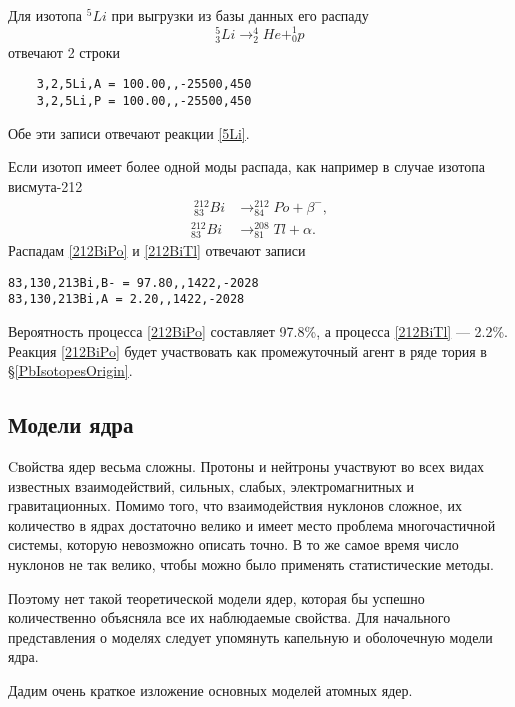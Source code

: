 \documentclass[a5paper,openany]{book}
\begin{document}
Для изотопа $^5Li$ при выгрузки из базы данных его распаду 
\begin{equation}\label{5Li}
_3^5Li \longrightarrow _2^4He + _0^1p
\end{equation}
отвечают 2 строки
\begin{verbatim}
	3,2,5Li,A = 100.00,,-25500,450
	3,2,5Li,P = 100.00,,-25500,450
\end{verbatim}		
Обе эти записи отвечают реакции \eqref{5Li}.

Если изотоп имеет более одной моды распада, как например в случае изотопа висмута-212
\begin{align}\
_{83}^{212}Bi & \longrightarrow _{84}^{212}Po + \beta^{-}, \label{212BiPo}\\
_{83}^{212}Bi & \longrightarrow _{81}^{208}Tl + \alpha. \label{212BiTl}
\end{align}
Распадам \eqref{212BiPo} и \eqref{212BiTl} отвечают записи  
\begin{verbatim}
83,130,213Bi,B- = 97.80,,1422,-2028
83,130,213Bi,A = 2.20,,1422,-2028
\end{verbatim}		
Вероятность процесса \eqref{212BiPo} составляет  97.8\%, а процесса \eqref{212BiTl} --- 2.2\%.
Реакция \eqref{212BiPo}  будет участвовать как промежуточный агент в ряде тория в \S\ref{PbIsotopesOrigin}. 
	
	\subsection{Модели ядра} \label{NucleiModels}
	
	Cвойства ядер весьма сложны. Протоны и нейтроны участвуют во всех видах известных взаимодействий, сильных, слабых, электромагнитных и гравитационных. Помимо того, что взаимодействия нуклонов сложное, их количество в ядрах достаточно велико и имеет место проблема многочастичной системы, которую невозможно описать точно. В то же самое время число нуклонов не так велико, чтобы можно было применять статистические методы.  
	
	Поэтому нет такой теоретической модели ядер, которая бы успешно количественно объясняла все их наблюдаемые свойства.
	Для начального представления о моделях следует упомянуть капельную и оболочечную модели ядра.
	
	Дадим очень краткое изложение основных  моделей атомных ядер. 
	
\end{document}

